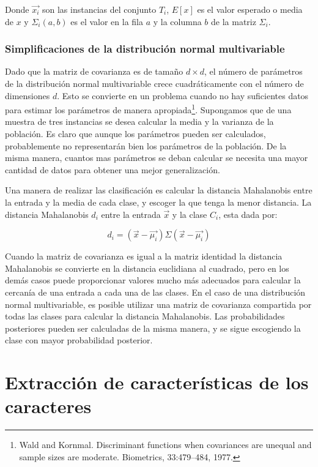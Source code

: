 \documentclass[a4paper, 11pt, oneside]{report}
\begin{document}
Donde $\vec{x_i}$ son las instancias del conjunto $T_i$, $E[x]$ es el valor esperado o media de $x$ y $\Sigma_i(a,b)$ es el valor en la fila $a$ y la columna $b$ de la matriz $\Sigma_i$.

\subsection{Simplificaciones de la distribución normal multivariable}

Dado que la matriz de covarianza es de tamaño $d \times d$, el número de parámetros de la distribución normal multivariable crece cuadráticamente con el número de dimensiones $d$. Esto se convierte en un problema cuando no hay suficientes datos para estimar los parámetros de manera apropiada\footnote{Wald and Kornmal. Discriminant functions when covariances are unequal and sample sizes are moderate. Biometrics, 33:479–484, 1977.}. Supongamos que de una muestra de tres instancias se desea calcular la media y la varianza de la población. Es claro que aunque los parámetros pueden ser calculados, probablemente no representarán bien los parámetros de la población. De la misma manera, cuantos mas parámetros se deban calcular se necesita una mayor cantidad de datos para obtener una mejor generalización.

Una manera de realizar las clasificación es calcular la distancia Mahalanobis entre la entrada y la media de cada clase, y escoger la que tenga la menor distancia. La distancia Mahalanobis $d_i$ entre la entrada $\vec{x}$ y la clase $C_i$, esta dada por:

	\begin{equation}
		\label{eq:mahalanobis}
		d_i = (\vec{x}-\vec{\mu_i})\Sigma(\vec{x}-\vec{\mu_i}) 
	\end{equation}

Cuando la matriz de covarianza es igual a la matriz identidad la distancia Mahalanobis se convierte en la distancia euclidiana al cuadrado, pero en los demás casos puede proporcionar valores mucho más adecuados para calcular la cercanía de una entrada a cada una de las clases. En el caso de una distribución normal multivariable, es posible utilizar una matriz de covarianza compartida por todas las clases para calcular la distancia Mahalanobis. Las probabilidades posteriores pueden ser calculadas de la misma manera, y se sigue escogiendo la clase con mayor probabilidad posterior.

\chapter{Extracción de características de los caracteres}
\label{chap:features}
\end{document}

